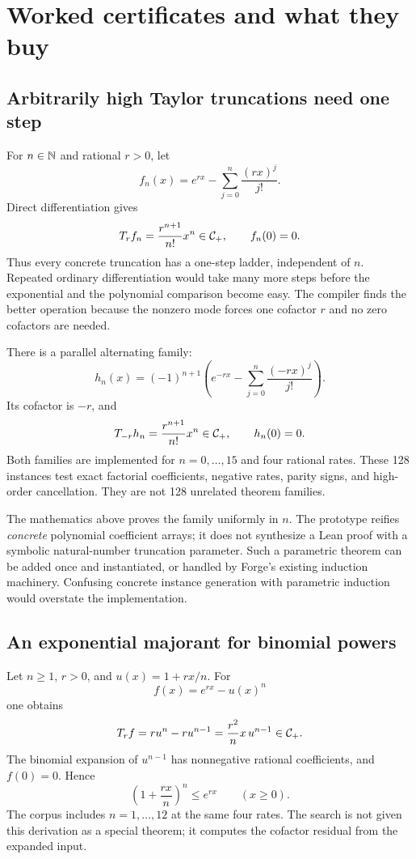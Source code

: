 \section{Worked certificates and what they buy}
\label{sec:examples}

\subsection{Arbitrarily high Taylor truncations need one step}

For $n\in\mathbb N$ and rational $r>0$, let
\[
 f_n(x)=e^{rx}-\sum_{j=0}^n\frac{(rx)^j}{j!}.
\]
Direct differentiation gives
\begin{equation}
 T_r f_n=\frac{r^{n+1}}{n!}x^n\in\mathcal C_+,
 \qquad f_n(0)=0.
 \label{eq:taylor-one}
\end{equation}
Thus every concrete truncation has a one-step ladder, independent of $n$. Repeated ordinary differentiation would take many more steps before the exponential and the polynomial comparison become easy. The compiler finds the better operation because the nonzero mode forces one cofactor $r$ and no zero cofactors are needed.

There is a parallel alternating family:
\[
 h_n(x)=(-1)^{n+1}\left(e^{-rx}-\sum_{j=0}^n\frac{(-rx)^j}{j!}\right).
\]
Its cofactor is $-r$, and
\[
 T_{-r}h_n=\frac{r^{n+1}}{n!}x^n\in\mathcal C_+,
 \qquad h_n(0)=0.
\]
Both families are implemented for $n=0,\ldots,15$ and four rational rates. These 128 instances test exact factorial coefficients, negative rates, parity signs, and high-order cancellation. They are not 128 unrelated theorem families.

The mathematics above proves the family uniformly in $n$. The prototype reifies \emph{concrete} polynomial coefficient arrays; it does not synthesize a Lean proof with a symbolic natural-number truncation parameter. Such a parametric theorem can be added once and instantiated, or handled by Forge's existing induction machinery. Confusing concrete instance generation with parametric induction would overstate the implementation.

\subsection{An exponential majorant for binomial powers}

Let $n\ge1$, $r>0$, and $u(x)=1+rx/n$. For
\[
 f(x)=e^{rx}-u(x)^n
\]
one obtains
\[
 T_r f=r u^n-r u^{n-1}
       =\frac{r^2}{n}x\,u^{n-1}\in\mathcal C_+.
\]
The binomial expansion of $u^{n-1}$ has nonnegative rational coefficients, and $f(0)=0$. Hence
\[
 \left(1+\frac{rx}{n}\right)^n\le e^{rx}\qquad(x\ge0).
\]
The corpus includes $n=1,\ldots,12$ at the same four rates. The search is not given this derivation as a special theorem; it computes the cofactor residual from the expanded input.

